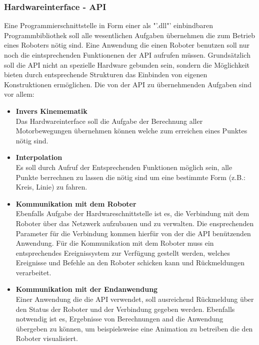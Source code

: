 \subsubsection{Hardwareinterface - API}
Eine Programmierschnittstelle in Form einer als "'.dll"' einbindbaren Programmbibliothek soll alle wesentlichen Aufgaben übernehmen die zum Betrieb eines Roboters nötig sind. Eine Anwendung die einen Roboter benutzen soll nur noch die eintsprechenden Funktionenen der API aufrufen müssen. Grundsätzlich soll die API nicht an spezielle Hardware gebunden sein, sondern die Möglichkeit bieten durch entsprechende Strukturen das Einbinden von eigenen Konstruktionen ermöglichen. 
Die von der API zu übernehmenden Aufgaben sind vor allem:
\begin{itemize}
\item \textbf{Invers Kinemematik}\\
Das Hardwareinterface soll die Aufgabe der Berechnung aller Motorbewegungen übernehmen können welche zum erreichen eines Punktes nötig sind.
\item \textbf{Interpolation}\\
Es soll durch Aufruf der Entsprechenden Funktionen möglich sein, alle Punkte berrechnen zu lassen die nötig sind um eine bestimmte Form (z.B.: Kreis, Linie) zu fahren.
\item \textbf{Kommunikation mit dem Roboter}\\
Ebenfalls Aufgabe der Hardwareschnittstelle ist es, die Verbindung mit dem Roboter über das Netzwerk aufzubauen und zu verwalten. Die ensprechenden Parameter für die Verbindung kommen hierfür von der die API benützenden Anwendung. Für die Kommunikation mit dem Roboter muss ein entsprechendes Ereignissystem zur Verfügung gestellt werden, welches Ereignisse und Befehle an den Roboter schicken kann und Rückmeldungen verarbeitet.
\item \textbf{Kommunikation mit der Endanwendung}\\
Einer Anwendung die die API verwendet, soll ausreichend Rückmeldung über den Status der Roboter und der Verbindung gegeben werden. Ebenfalls notwendig ist es, Ergebnisse von Berechnungen and die Anwendung übergeben zu können, um beispielsweise eine Animation zu betreiben die den Roboter visualisiert.
\end{itemize}
